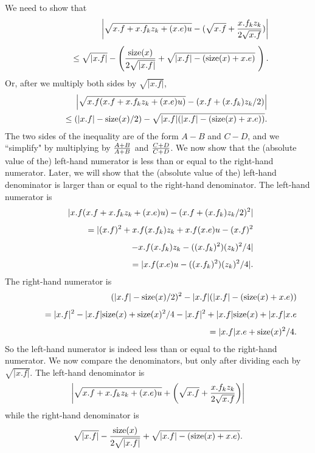 We need to show that 
\begin{eqnarray*}
&&\hskip-35pt \left|\sqrt {x.f + x.f_k z_k + (x.e) u} - (\sqrt{x.f} + {x.f_k z_k\over 2 \sqrt {x.f}})\right|\\[4pt]
&&\qquad \le \sqrt{|x.f|} - \left({{\rm size}(x) \over 2 \sqrt {|x.f|}} + \sqrt {|x.f| - ({\rm size}(x) + x.e)}\ \right).
\end{eqnarray*}
Or, after we multiply both sides by $\sqrt {|x.f|}$,  
\begin{eqnarray*}
&&
\hskip-35pt\left| \sqrt {x.f (x.f + x.f_k z_k + (x.e) u)} - (x.f + (x.f_k) z_k /2) \right|\\
&&\quad \le \left( |x.f| - {\rm size}(x) /2\right) - \sqrt {|x.f|(|x.f| - ({\rm size}(x) +
x.e))}.
\end{eqnarray*}
 The two  sides of the inequality are of the form $ A - B$ and $C - D$, and we
``simplify" by multiplying by  
${ A+ B \over A + B}$ and ${ C+ D \over C + D}$.   We now show that the (absolute value of the) left-hand numerator is less than or equal to the right-hand numerator.  Later, we will show that the (absolute value of the) left-hand denominator is larger than or equal to the right-hand denominator. 
The   left-hand numerator is 
\begin{eqnarray*}
&&\hskip-35pt |x.f (x.f + x.f_k z_k + (x.e) u) - (x.f + (x.f_k) z_k /2)^2|\\[4pt]
&&\qquad 
 = |(x.f)^ 2 + x.f (x.f_k) z_k + x.f (x.e) u - (x.f)^2\\[4pt]
&&\qquad\quad - x.f (x.f_k) z_k - ((x.f_k)^2) (z_k)^2/4|\\[4pt]
&&\qquad = |x.f (x.e) u - ((x.f_k)^2) (z_k)^2/4|.
\end{eqnarray*}
The right-hand numerator is 
\begin{eqnarray*}
&&(|x.f| - {\rm size}(x)/2)^2 - |x.f| (|x.f| - ({\rm size}(x) + x.e))\\[4pt]
&&\qquad = |x.f|^2 - |x.f| {\rm size}(x) + {\rm size}(x)^2/4 - |x.f|^2 + |x.f| {\rm
size}(x) + |x.f| x.e\\[4pt]
&&\qquad = |x.f| x.e + {\rm size}(x)^2/4.
\end{eqnarray*}
So the left-hand numerator is indeed less than or equal to the right-hand numerator.
We now compare the denominators, but only after dividing each by
$\sqrt {|x.f|}$. 
The left-hand denominator is
$$\left|\sqrt {x.f + x.f_k z_k + (x.e) u} + 
\left(\sqrt {x.f} + {x.f_k z_k\over 2 \sqrt{x.f}}\right)\right|$$
while the right-hand denominator is 
$$\sqrt{|x.f|} - {{\rm size}(x) \over 2 \sqrt {|x.f|}} + \sqrt {|x.f| - ({\rm size}(x) + x.e)}.$$
